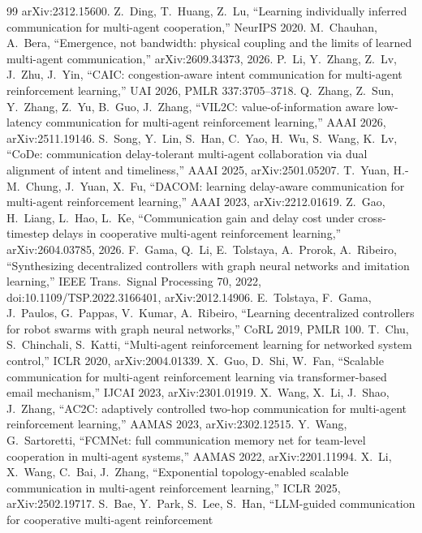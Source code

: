 \documentclass[11pt]{article}
\theoremstyle{definition}
\begin{document}
\begin{thebibliography}{99}
arXiv:2312.15600.
 Z.~Ding, T.~Huang, Z.~Lu, ``Learning individually inferred communication for multi-agent cooperation,''
NeurIPS 2020.
 M.~Chauhan, A.~Bera, ``Emergence, not bandwidth: physical coupling and the limits of learned
multi-agent communication,'' arXiv:2609.34373, 2026.
 P.~Li, Y.~Zhang, Z.~Lv, J.~Zhu, J.~Yin, ``CAIC: congestion-aware intent communication for multi-agent
reinforcement learning,'' UAI 2026, PMLR 337:3705--3718.
 Q.~Zhang, Z.~Sun, Y.~Zhang, Z.~Yu, B.~Guo, J.~Zhang, ``VIL2C: value-of-information aware low-latency
communication for multi-agent reinforcement learning,'' AAAI 2026, arXiv:2511.19146.
 S.~Song, Y.~Lin, S.~Han, C.~Yao, H.~Wu, S.~Wang, K.~Lv, ``CoDe: communication delay-tolerant multi-agent collaboration via dual alignment of intent and
timeliness,'' AAAI 2025, arXiv:2501.05207.
 T.~Yuan, H.-M.~Chung, J.~Yuan, X.~Fu, ``DACOM: learning delay-aware communication for multi-agent
reinforcement learning,'' AAAI 2023, arXiv:2212.01619.
 Z.~Gao, H.~Liang, L.~Hao, L.~Ke, ``Communication gain and delay cost under cross-timestep delays in
cooperative multi-agent reinforcement learning,'' arXiv:2604.03785, 2026.
 F.~Gama, Q.~Li, E.~Tolstaya, A.~Prorok, A.~Ribeiro, ``Synthesizing decentralized controllers with graph
neural networks and imitation learning,'' IEEE Trans.\ Signal Processing 70, 2022, doi:10.1109/TSP.2022.3166401,
arXiv:2012.14906.
 E.~Tolstaya, F.~Gama, J.~Paulos, G.~Pappas, V.~Kumar, A.~Ribeiro, ``Learning decentralized
controllers for robot swarms with graph neural networks,'' CoRL 2019, PMLR 100.
 T.~Chu, S.~Chinchali, S.~Katti, ``Multi-agent reinforcement learning for networked system control,''
ICLR 2020, arXiv:2004.01339.
 X.~Guo, D.~Shi, W.~Fan, ``Scalable communication for multi-agent reinforcement learning via
transformer-based email mechanism,'' IJCAI 2023, arXiv:2301.01919.
 X.~Wang, X.~Li, J.~Shao, J.~Zhang, ``AC2C: adaptively controlled two-hop communication for multi-agent
reinforcement learning,'' AAMAS 2023, arXiv:2302.12515.
 Y.~Wang, G.~Sartoretti, ``FCMNet: full communication memory net for team-level cooperation in
multi-agent systems,'' AAMAS 2022, arXiv:2201.11994.
 X.~Li, X.~Wang, C.~Bai, J.~Zhang, ``Exponential topology-enabled scalable communication in
multi-agent reinforcement learning,'' ICLR 2025, arXiv:2502.19717.
 S.~Bae, Y.~Park, S.~Lee, S.~Han, ``LLM-guided communication for cooperative multi-agent reinforcement

\end{thebibliography}
\end{document}
